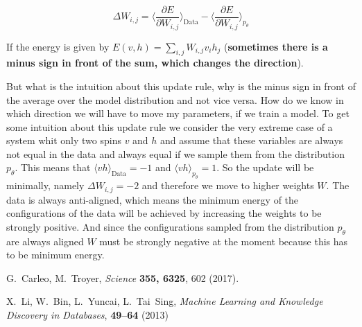 \documentclass[nofootinbib, superscriptaddress, prl]{revtex4}
\begin{document}
\begin{equation*}
	\Delta W_{i,j} = \langle \frac{ \partial E}{\partial W_{i,j}} \rangle_{\text{Data}} - \langle \frac{\partial E}{\partial W_{i,j}} \rangle_{p_{\theta}} %
\end{equation*}

If the energy is given by $E(v,h) = \sum_{i,j} W_{i,j} v_i h_j $ (\textbf{sometimes there is a minus sign in front of the sum, which changes the direction}).

But what is the intuition about this update rule, why is the minus sign in front of the average over the model distribution and not vice versa. How do we know in which direction we will have to move my parameters, if we train a model.
To get some intuition about this update rule we consider the very extreme case of a system whit only two spins $v$ and $h$ and assume that these variables are always not equal in the data and always equal if we sample them from the distribution $p_{\theta}$. This means that $\langle v h \rangle_{\text{Data}} = -1$
 and $\langle v h \rangle_{p_{\theta}}  = 1$. So the update will be minimally, namely $\Delta W_{i,j} = -2$ and therefore we move to higher weights $W$. The data is always anti-aligned, which means the minimum energy of the configurations of the data will be achieved by increasing the weights to be strongly positive. And since the configurations sampled from the distribution $p_{\theta}$ are always aligned $W$ must be strongly negative at the moment because this has to be minimum energy.
 
\begin{thebibliography}{10}

G.~Carleo, M.~Troyer, {\it Science\/} {\bf 355, 6325}, 602
  (2017).

X.~Li, W.~Bin, L.~Yuncai, L.~Tai~Sing, {\it Machine Learning and Knowledge Discovery in Databases}, {\bf 49--64} (2013)

\end{thebibliography} 
\end{document}
